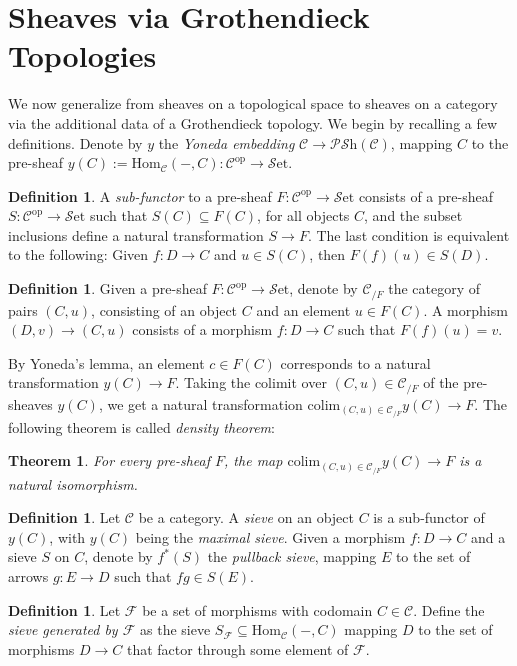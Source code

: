 \documentclass[10pt]{amsart}
\newcommand{\C}{\mathscr{C}}
\newcommand{\F}{\mathscr{F}}
\newcommand{\Hom}{\mathrm{Hom}}
\newcommand{\set}{\mathscr{S}\mathrm{et}}
\newcommand{\colim}{\mathrm{colim}}
\newcommand{\PSh}{\mathscr{P}\mathscr{S}\mathrm{h}}
\newcommand{\op}{\mathrm{op}}
\newtheorem{theorem}[equation]{Theorem}
\theoremstyle{definition}
\newtheorem{definition}[equation]{Definition}
\theoremstyle{remark}
\numberwithin{equation}{section}
\begin{document}
	\section{Sheaves via Grothendieck Topologies}
	
	We now generalize from sheaves on a topological space to sheaves on a category via the additional data of a Grothendieck topology. We begin by recalling a few definitions. Denote by $y$ the \textit{Yoneda embedding} $\C\to\PSh(\C)$, mapping $C$ to the pre-sheaf $y(C):=\Hom_\C(-,C)\colon\C^{\op}\to\set$. 
	\begin{definition}
		A \emph{sub-functor} to a pre-sheaf $F\colon\C^{\op}\to\set$ consists of a pre-sheaf $S:\C^{\op}\to\set$ such that $S(C)\subseteq F(C)$, for all objects $C$, and the subset inclusions define a natural transformation $S\to F$. The last condition is equivalent to the following: Given $f\colon D\to C$ and $u\in S(C)$, then $F(f)(u)\in S(D)$. 
	\end{definition}
	\begin{definition}
		Given a pre-sheaf $F\colon\C^{\op}\to\set$, denote by $\C_{/F}$ the category of pairs $(C,u)$, consisting of an object $C$ and an element $u\in F(C)$. A morphism $(D,v)\to(C,u)$ consists of a morphism $f\colon D\to C$ such that $F(f)(u)=v$. 
	\end{definition}By Yoneda's lemma, an element $c\in F(C)$ corresponds to a natural transformation $y(C)\rightarrow F$. Taking the colimit over $(C,u)\in\C_{/F}$ of the pre-sheaves $y(C)$, we get a natural transformation $\colim_{(C,u)\in\C_{/F}}y(C)\rightarrow F$. The following theorem is called \textit{density theorem}:
	\begin{theorem}\label{density}
		For every pre-sheaf $F$, the map $\colim_{(C,u)\in\C_{/F}}y(C)\rightarrow F$ is a natural isomorphism.
	\end{theorem}
	\begin{definition}
		Let $\C$ be a category. A \emph{sieve} on an object $C$ is a sub-functor of $y(C)$, with $y(C)$ being the \textit{maximal sieve}. Given a morphism $f\colon D\to C$ and a sieve $S$ on $C$, denote by $f^*(S)$ the \textit{pullback sieve}, mapping $E$ to the set of arrows $g\colon E\to D$ such that $fg\in S(E)$. 
	\end{definition}
	\begin{definition}\label{def:generatedsieve}
		Let ${\F}$ be a set of morphisms with codomain $C\in\C$. Define the \emph{sieve generated by $\F$} as the sieve $S_\F\subseteq\Hom_\C(-,C)$ mapping $D$ to the set of morphisms $D\to C$ that factor through some element of $\F$. 
	\end{definition}
\end{document}
